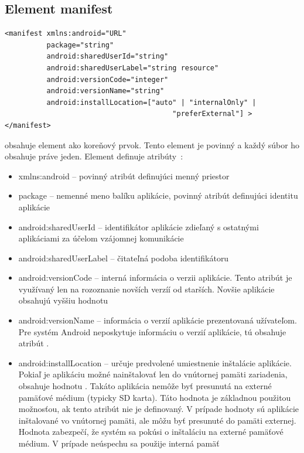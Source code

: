 \subsection{Element manifest}
\label{el_manifest}
\lstset{language=XML}
\begin{lstlisting}
<manifest xmlns:android="URL"
          package="string"
          android:sharedUserId="string"
          android:sharedUserLabel="string resource"
          android:versionCode="integer"
          android:versionName="string"
          android:installLocation=["auto" | "internalOnly" |
                                        "preferExternal"] >
</manifest>
\end{lstlisting}
 obsahuje element  ako koreňový prvok. Tento element je povinný a každý súbor  ho obsahuje práve jeden. \newline\newline
\noindent Element  definuje atribúty~\cite{elManifest}:\\
\begin{itemize}
\item xmlns:android – povinný atribút definujúci menný priestor
\item package – nemenné meno balíku aplikácie, povinný atribút definujúci identitu aplikácie
\item android:sharedUserId – identifikátor aplikácie zdieľaný s ostatnými aplikáciami za účelom vzájomnej komunikácie
\item android:sharedUserLabel – čitateľná podoba  identifikátoru
\item android:versionCode – interná informácia o verzii aplikácie. Tento atribút je využívaný len na rozoznanie novších verzíí od starších. Novšie aplikácie obsahujú vyššiu hodnotu
\item android:versionName – informácia o verzií aplikácie prezentovaná užívateľom. Pre systém Android neposkytuje informáciu o verzií aplikácie, tú obsahuje atribút .
\item android:installLocation – určuje predvolené umiestnenie inštalácie aplikácie. Pokiaľ je aplikáciu možné nainštalovať len do vnútornej pamäti zariadenia, obsahuje hodnotu . Takáto aplikácia nemôže byť presunutá na externé pamäťové médium (typicky SD karta). Táto hodnota je základnou použitou možnosťou, ak tento atribút nie je definovaný. V prípade hodnoty  sú aplikácie inštalované vo vnútornej pamäti, ale môžu byť presunuté do pamäti externej. Hodnota  zabezpečí, že systém sa pokúsi o inštaláciu na externé pamäťové médium. V prípade neúspechu sa použije interná pamäť
\end{itemize}

